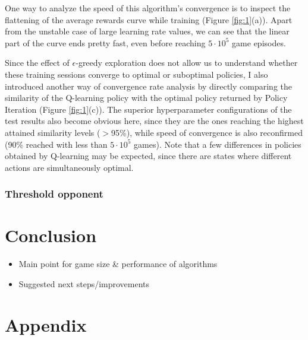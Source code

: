 One way to analyze the speed of this algorithm's convergence is to inspect the flattening of the average rewards curve while training (Figure \ref{fig:1}(a)). Apart from the unstable case of large learning rate values, we can see that the linear part of the curve ends pretty fast, even before reaching $5\cdot10^5$ game episodes. 

Since the effect of $\epsilon$-greedy exploration does not allow us to understand whether these training sessions converge to optimal or suboptimal policies, I also introduced another way of convergence rate analysis by directly comparing the similarity of the Q-learning policy with the optimal policy returned by Policy Iteration (Figure \ref{fig:1}(c)). The superior hyperparameter configurations of the test results also become obvious here, since they are the ones reaching the highest attained similarity levels ($>$95\%), while speed of convergence is also reconfirmed (90\% reached with less than $5\cdot10^5$ games). Note that a few differences in policies obtained by Q-learning may be expected, since there are states where different actions are simultaneously optimal.

\subsubsection{Threshold opponent}


\section{Conclusion}

\begin{itemize}
\item Main point for game size \& performance of algorithms
\item Suggested next steps/improvements
\end{itemize}

\clearpage

\section*{Appendix}

